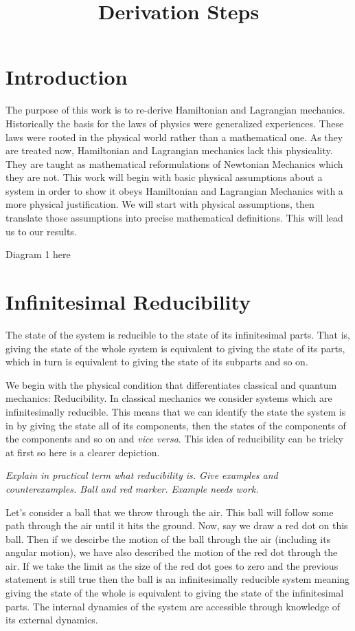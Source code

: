 \documentclass{article}
\begin{document}
\title{Derivation Steps}

\section{Introduction}

	The purpose of this work is to re-derive Hamiltonian and Lagrangian mechanics. Historically the basis for the laws of physics were generalized experiences. These laws were rooted in the physical world rather than a mathematical one. As they are treated now, Hamiltonian and Lagrangian mechanics lack this physicality. They are taught as mathematical reformulations of Newtonian Mechanics which they are not. This work will begin with basic physical assumptions about a system in order to show it obeys Hamiltonian and Lagrangian Mechanics with a more physical justification. We will start with physical assumptions, then translate those assumptions into precise mathematical definitions. This will lead us to our results. 
	
Diagram 1 here

\section{Infinitesimal Reducibility}
	
\begin{assump}
	The state of the system is reducible to the state of its infinitesimal parts. That is, giving the state of the whole system is equivalent to giving the state of its parts, which in turn is equivalent to giving the state of its subparts and so on.
\end{assump}

	We begin with the physical condition that differentiates classical and quantum mechanics: Reducibility. In classical mechanics we consider systems which are infinitesimally reducible. This means that we can identify the state the system is in by giving the state all of its components, then the states of the components of the components and so on and \textit{vice versa}. This idea of reducibility can be tricky at first so here is a clearer depiction.
	
	\emph{Explain in practical term what reducibility is. Give examples and counterexamples. Ball and red marker. Example needs work.}
	
	Let's consider a ball that we throw through the air. This ball will follow some path through the air until it hits the ground. Now, say we draw a red dot on this ball. Then if we descirbe the motion of the ball through the air (including its angular motion), we have also described the motion of the red dot through the air. If we take the limit as the size of the red dot goes to zero and the previous statement is still true then the ball is an infinitesimally reducible system meaning giving the state of the whole is equivalent to giving the state of the infinitesimal parts. The internal dynamics of the system are accessible through knowledge of its external dynamics.
	
\end{document}
